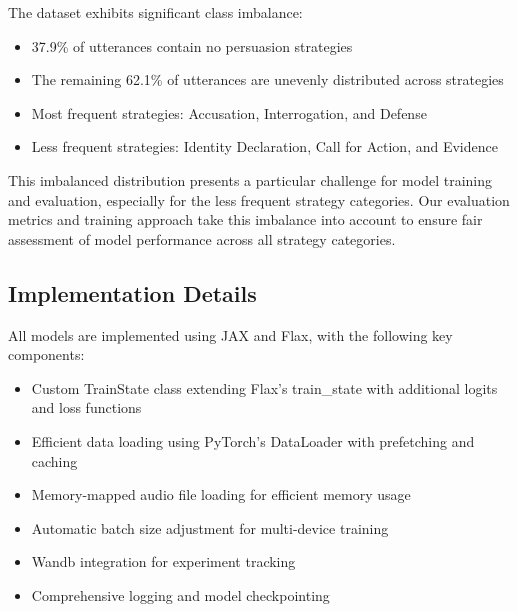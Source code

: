 \documentclass[10pt,twocolumn]{article}
\begin{document}
The dataset exhibits significant class imbalance:
\begin{itemize}
    \item 37.9\% of utterances contain no persuasion strategies
    \item The remaining 62.1\% of utterances are unevenly distributed across strategies
    \item Most frequent strategies: Accusation, Interrogation, and Defense
    \item Less frequent strategies: Identity Declaration, Call for Action, and Evidence
\end{itemize}

This imbalanced distribution presents a particular challenge for model training and evaluation, especially for the less frequent strategy categories. Our evaluation metrics and training approach take this imbalance into account to ensure fair assessment of model performance across all strategy categories.

\subsection{Implementation Details}
All models are implemented using JAX and Flax, with the following key components:
\begin{itemize}
    \item Custom TrainState class extending Flax's train\_state with additional logits and loss functions
    \item Efficient data loading using PyTorch's DataLoader with prefetching and caching
    \item Memory-mapped audio file loading for efficient memory usage
    \item Automatic batch size adjustment for multi-device training
    \item Wandb integration for experiment tracking
    \item Comprehensive logging and model checkpointing
\end{itemize}
\end{document}
